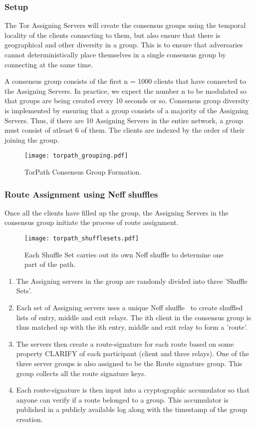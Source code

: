 \subsubsection{Setup}
The Tor Assigning Servers will create the consensus groups using the temporal locality of the clients connecting to them, but also ensure that there is geographical and other diversity in a group. This is to ensure that adversaries cannot deterministically place themselves in a single consensus group by connecting at the same time.

A consensus group consists of the first n = 1000 clients that have connected to the Assigning Servers. In practice, we expect the number n to be modulated so that groups are being created every 10 seconds or so. Consensus group diversity is implemented by ensuring that a group consists of a majority of the Assigning Servers. Thus, if there are 10 Assigning Servers in the entire network, a group must consist of atleast 6 of them. The clients are indexed by the order of their joining the group.

\begin{figure}
  \centering
    \texttt{[image: torpath\_grouping.pdf]}
  \caption{TorPath Consensus Group Formation.}
\end{figure}

\subsubsection{Route Assignment using Neff shuffles}
Once all the clients have filled up the group, the Assigning Servers in the consensus group initiate the process of route assignment.

\begin{figure}
  \centering
    \texttt{[image: torpath\_shufflesets.pdf]}
  \caption{Each Shuffle Set carries out its own Neff shuffle to determine one part of the path.}
\end{figure}

\begin{enumerate}
  \item The Assigning servers in the group are randomly divided into three 'Shuffle Sets'.
  \item Each set of Assigning servers uses a unique Neff shuffle~\cite{neff2001verifiable} to create shuffled lists of entry, middle and exit relays. The ith client in the consensus group is thus matched up with the ith entry, middle and exit relay to form a 'route'.
  \item The servers then create a route-signature for each route based on some property CLARIFY of each participant (client and three relays). One of the three server groups is also assigned to be the Route signature group. This group collects all the route signature keys.
  \item Each route-signature is then input into a cryptographic accumulator so that anyone can verify if a route belonged to a group. This accumulator is published in a publicly available log along with the timestamp of the group creation.
\end{enumerate}


